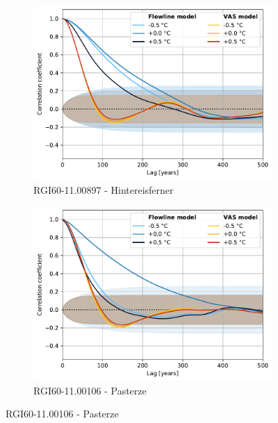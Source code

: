       \begin{figure}[htp]
        \centering
        
        \begin{subfigure}[b]{0.48\textwidth}
          \caption{RGI60-11.00897 - Hintereisferner}
          \label{fig:acf:hintereisferner}
          \centering
          \includegraphics[width=\textwidth]{../plots/final_plots/acf/Hintereisferner.pdf}
        \end{subfigure}
        \hfill
        \begin{subfigure}[b]{0.48\textwidth}
          \caption{RGI60-11.00106 - Pasterze}
          \label{fig:acf:pasterze}
          \centering
          \includegraphics[width=\textwidth]{../plots/final_plots/acf/Pasterze.pdf}
        \end{subfigure}


\end{figure}
